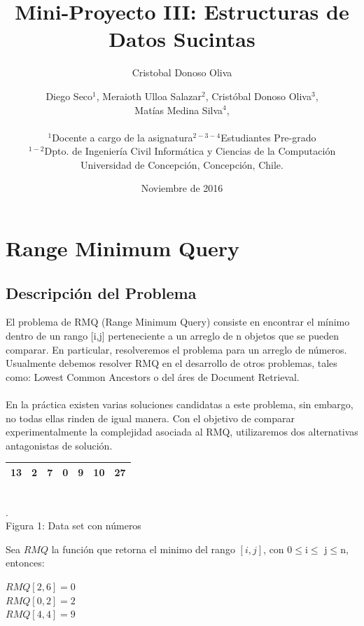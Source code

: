 \documentclass[11pt]{article}
\title{Mini-Proyecto III: Estructuras de Datos Sucintas}
\author{Cristobal Donoso Oliva}
\author{
Diego Seco$^{1}$, Meraioth Ulloa Salazar$^{2}$, Cristóbal Donoso Oliva$^{3}$,\\ Matías Medina Silva$^{4}$,\\ \\
\small{$^{1}$Docente a cargo de la asignatura$^{2-3-4}$Estudiantes Pre-grado}\\
\small{$^{1-2}$Dpto. de Ingeniería Civil Informática y Ciencias de la Computación}\\
\small{Universidad de Concepción, Concepción, Chile.}\\
}
\date{Noviembre de 2016}
\begin{document}
\maketitle

\section{Range Minimum Query}
\subsection{Descripción del Problema}
El problema de RMQ (Range Minimum Query) consiste en encontrar el mínimo dentro de un rango [i,j] perteneciente a un arreglo de n objetos que se pueden comparar. En particular, resolveremos el problema para un arreglo de números. Usualmente debemos resolver RMQ en el desarrollo de otros problemas, tales como: Lowest Common Ancestors o del áres de Document Retrieval.\\\\En la práctica existen varias soluciones candidatas a este problema, sin embargo, no todas ellas rinden de igual manera. Con el objetivo de comparar experimentalmente la complejidad asociada al RMQ, utilizaremos dos alternativas antagonistas de solución.\\
\begin{center}\begin{tabular}{|c|c|c|c|c|c|c|}
\hline
	13 & 2 & 7 & 0 & 9 & 10 & 27 \\
\hline
\end{tabular}
\\\scriptsize{\color{white}.\color{black}\\Figura 1: Data set con números}
\end{center}
Sea $RMQ$ la función que retorna el minimo del rango $[i,j]$, con 0$\le$i$\le$ j$\le$n, entonces: \begin{center}$RMQ[2,6] = 0$\\$RMQ[0,2] = 2$\\$RMQ[4,4] = 9$\end{center}  
\end{document}
